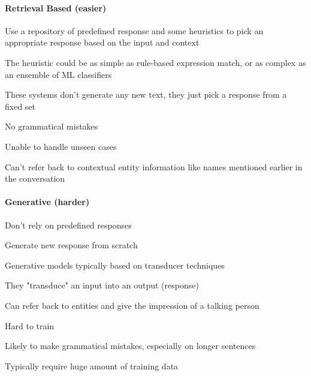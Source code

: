 \documentclass[10pt]{report}
\begin{document}
\begin{multicols}{2}
\paragraph{Retrieval Based (easier)}
\begin{list}{}{}
	\item Use a repository of predefined response and some heuristics to pick an appropriate response based on the input and context
	\item The heuristic could be as simple as rule-based expression match, or as complex as an ensemble of ML classifiers
	\item These systems don't generate any new text, they just pick a response from a fixed set
	\item No grammatical mistakes
	\item Unable to handle unseen cases
	\item Can't refer back to contextual entity information like names mentioned earlier in the conversation
\end{list}
\paragraph{Generative (harder)}
\begin{list}{}{}
	\item Don't rely on predefined responses
	\item Generate new response from scratch
	\item Generative models typically based on transducer techniques
	\item They "transduce" an input into an output (response)
	\item Can refer back to entities and give the impression of a talking person
	\item Hard to train
	\item Likely to make grammatical mistakes, especially on longer sentences
	\item Typically require huge amount of training data
\end{list}
\end{multicols}
\end{document}
